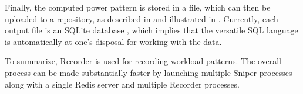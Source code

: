 Finally, the computed power pattern is stored in a file, which can then be
uploaded to a repository, as described in  and illustrated in
. Currently, each output file is an SQLite database
\cite{sqlite}, which implies that the versatile SQL language is automatically at
one's disposal for working with the data.

To summarize, Recorder is used for recording workload patterns. The overall
process can be made substantially faster by launching multiple Sniper processes
along with a single Redis server and multiple Recorder processes.
